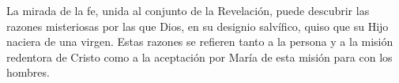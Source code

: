 	
	 La mirada de la fe, unida al conjunto de la Revelación, puede descubrir las razones misteriosas por las que Dios, en su designio salvífico, quiso que su Hijo naciera de una virgen. Estas razones se refieren tanto a la persona y a la misión redentora de Cristo como a la aceptación por María de esta misión para con los hombres.
